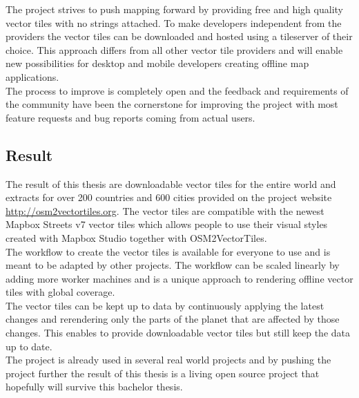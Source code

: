 The \osmvt{} project strives to push mapping forward by providing free and high quality vector tiles with no strings attached. To make developers independent from the providers
the vector tiles can be downloaded and hosted using a tileserver of their choice. This approach differs from all other vector tile providers and will enable new possibilities for desktop and mobile developers creating offline map applications.\\

The process to improve \osmvt{} is completely open and the feedback and requirements of the
community have been the cornerstone for improving the project with most feature requests and
bug reports coming from actual users.

\subsection*{Result}

The result of this thesis are downloadable vector tiles for the entire world and extracts for over 200 countries and 600 cities provided on the project website \url{http://osm2vectortiles.org}. The vector tiles are compatible with the newest Mapbox Streets v7 vector tiles which allows people to use their visual styles created with Mapbox Studio together with OSM2VectorTiles.\\

The workflow to create the vector tiles is available for everyone to use and is meant to be adapted by other projects. The workflow can be scaled linearly by adding more worker machines and is a unique approach to rendering offline vector tiles with global coverage.\\

The vector tiles can be kept up to data by continuously applying the latest \osm{} changes and rerendering only the parts of the planet that are affected by those changes. This enables to provide downloadable vector tiles but still keep the data up to date.\\

The \osmvt{} project is already used in several real world projects and by pushing the project further the result of this thesis is a living open source project that hopefully will survive this bachelor thesis.
    
